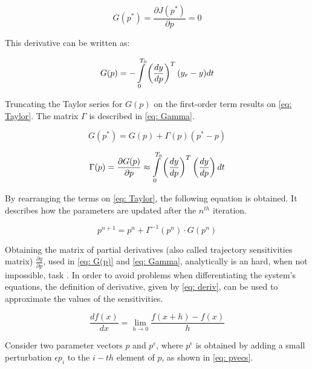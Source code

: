 \begin{equation}
	G(p^{*}) = \frac{\partial J(p^{*})}{\partial p} = 0
\end{equation}

This derivative can be written as:

\begin{equation}	
	G(p) = -\int\displaylimits_{0}^{T_{0}} \left(\frac{dy}{dp}\right)^{T} (y_{r} - y) dt
	\label{eq: G(p)}
\end{equation}

Truncating the Taylor series for $G(p)$ on the first-order term results on \eqref{eq: Taylor}. The matrix $\Gamma$ is described in \eqref{eq: Gamma}.

\begin{equation}
	G(p^{*}) = G(p) + \Gamma (p)(p^{*} - p)
	\label{eq: Taylor}
\end{equation}

\begin{equation}
	\Gamma (p) = \frac{\partial G(p)}{\partial p} \approx \int\displaylimits_{0}^{T_{0}} \left(\frac{dy}{dp}\right)^{T} \left(\frac{dy}{dp}\right) dt
	\label{eq: Gamma}
\end{equation}

By rearranging the terms on \eqref{eq: Taylor}, the following equation is obtained. It describes how the parameters are updated after the $n^{th}$ iteration.

\begin{equation}
	p^{n+1} = p^{n} + \Gamma^{-1}(p^{n})\cdot G(p^{n})
\end{equation}

Obtaining the matrix of partial derivatives (also called trajectory sensitivities matrix) $\frac{\partial y}{\partial p}$, used in \eqref{eq: G(p)} and \eqref{eq: Gamma}, analytically is an hard, when not impossible, task . In order to avoid problems when differentiating the system's equations, the definition of derivative, given by \eqref{eq: deriv}, can be used to approximate the values of the sensitivities.

\begin{equation}
	\frac{df(x)}{dx} = \lim\limits_{h \to 0} \frac{f(x + h) - f(x)}{h}
	\label{eq: deriv}
\end{equation}

Consider two parameter vectors $p$ and $p^{\epsilon}$, where $p^{\epsilon}$ is obtained by adding a small perturbation $\epsilon p_{i}$ to the $i-th$ element of $p$, as shown in \eqref{eq: pvecs}.

